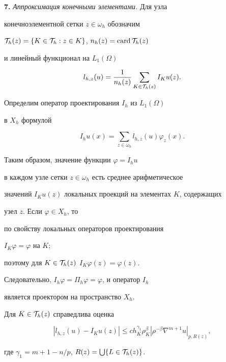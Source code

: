 {\bf 7.} {\it Аппроксимация конечными элементами.} Для узла 


конечноэлементной сетки $z \in \omega_h $ обозначим 


${\cal T}_h(z)=\{K \in {\cal T}_h: z \in K\}$, $n_h(z)=\operatorname{card}{\cal T}_h(z)$


и линейный функционал на $L_1(\Omega)$


$$


l_{h,z}(u)=\frac{1}{n_h(z)} 


\sum _{K \in {\cal T}_h(z)} I_Ku(z).


$$ 


Определим оператор проектирования $I_h$ из $L_1(\Omega)$ 


в $X_h$ формулой 


$$


I_h u(x) = \sum \limits_{z \in \omega_h} l_{h,z}(u) \varphi_z(x).


$$


Таким образом, значение функции $\varphi=I_hu$


в каждом узле сетки $z \in \omega_h$ есть среднее арифметическое 


значений $I_Ku(z)$ локальных проекций на элементах $K$, содержащих 


узел $z$. Если $\varphi \in X_h$, то


по свойству локальных операторов проектирования


$I_K \varphi=\varphi$ на $K$;


поэтому для $K \in {\cal T}_h(z)$\; $I_K \varphi(z)=\varphi(z)$. 


Следовательно, $I_h \varphi=\Pi_h \varphi=\varphi$, и оператор $I_h$ 


является проектором на пространство $X_h$. 





\begin{lem}\label{l_hz}


Для $K \in {\cal T}_h(z)$ справедлива оценка 


$$


|l_{h,z}(u)-I_Ku(z)| \le c h_K^{\gamma_1}


\rho_K^\beta{|\rho^{-\beta}\nabla^{m+1}u|}_{p,R(z)}, 


$$ 


где $\gamma_1=m+1-n/p$, $R(z)=\bigcup \{L \in {\cal T}_h(z)\}$.


\end{lem} 





